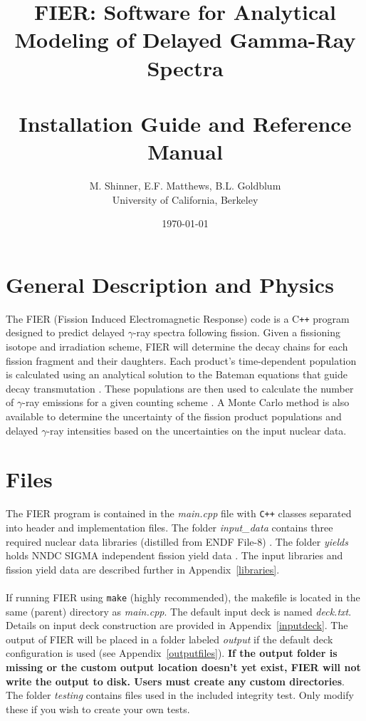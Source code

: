 \documentclass{article}
\title{FIER: Software for Analytical Modeling of Delayed Gamma-Ray Spectra\\ ~\\Installation Guide and Reference Manual}
\author{
M. Shinner, E.F. Matthews, B.L. Goldblum\\
University of California, Berkeley
}
\date{\today}
\begin{document}
\maketitle

\section{General Description and Physics}
The FIER (Fission Induced Electromagnetic Response) code is a C\texttt{++} program designed to predict delayed $\gamma$-ray spectra following fission. Given a fissioning isotope and irradiation scheme, FIER will determine the decay chains for each fission fragment and their daughters. Each product's time-dependent population is calculated using an analytical solution to the Bateman equations that guide decay transmutation \cite{bateman}. These populations are then used to calculate the number of $\gamma$-ray emissions for a given counting scheme \cite{fierpaper}. A Monte Carlo method is also available to determine the uncertainty of the fission product populations and delayed $\gamma$-ray intensities based on the uncertainties on the input nuclear data. 



\section{Files}
The FIER program is contained in the \textit{main.cpp} file with \texttt{C++} classes separated into header and implementation files. The folder \textit{input\_data} contains three required nuclear data libraries (distilled from ENDF File-8) \cite{endf}. The folder \textit{yields} holds NNDC SIGMA independent fission yield data \cite{SIGMA}. The input libraries and fission yield data are described further in Appendix~\ref{libraries}.
\\
\\
If running FIER using \texttt{make} (highly recommended), the makefile is located in the same (parent) directory as \textit{main.cpp}. The default input deck is named \textit{deck.txt}. Details on input deck construction are provided in Appendix~\ref{inputdeck}. The output of FIER will be placed in a folder labeled \textit{output} if the default deck configuration is used (see Appendix~\ref{outputfiles}).  \textbf{If the output folder is missing or the custom output location doesn't yet exist, FIER will not write the output to disk. Users must create any custom directories}. The folder \textit{testing} contains files used in the included integrity test. Only modify these if you wish to create your own tests.
\end{document}
